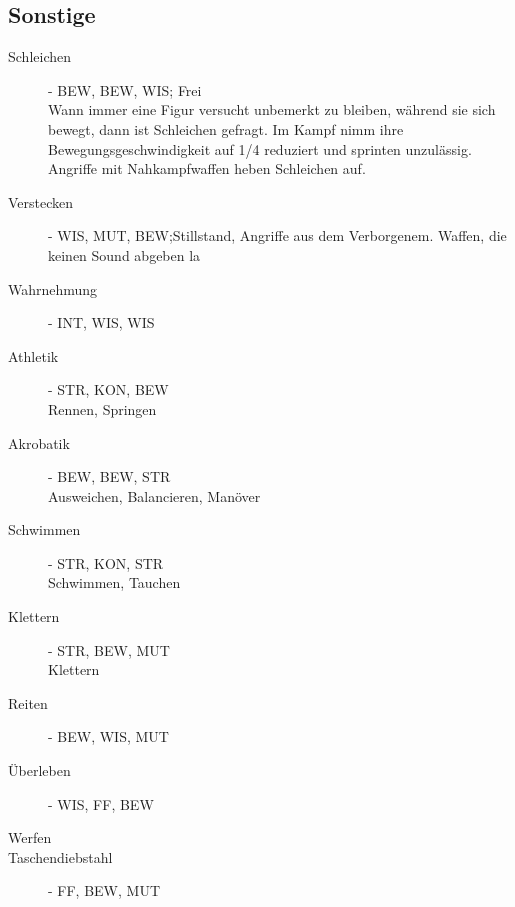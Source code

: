 \documentclass[a4paper,12pt,oneside]{book}
\begin{document}
\subsection{Sonstige}
\begin{description}
\item[Schleichen]- BEW, BEW, WIS; Frei
\\Wann immer eine Figur versucht unbemerkt zu bleiben, während sie sich bewegt, dann ist Schleichen gefragt. Im Kampf nimm ihre Bewegungsgeschwindigkeit auf 1/4 reduziert und sprinten unzulässig. Angriffe mit Nahkampfwaffen heben Schleichen auf.
\item[Verstecken]- WIS, MUT, BEW;Stillstand, Angriffe aus dem Verborgenem. Waffen, die keinen Sound abgeben la
\item[Wahrnehmung]- INT, WIS, WIS
\item[Athletik]- STR, KON, BEW
\\Rennen, Springen 
\item[Akrobatik]- BEW, BEW, STR
\\Ausweichen, Balancieren, Manöver
\item[Schwimmen]- STR, KON, STR
\\Schwimmen, Tauchen
\item[Klettern]- STR, BEW, MUT
\\Klettern
\item[Reiten]- BEW, WIS, MUT
\item[Überleben]- WIS, FF, BEW
\item[Werfen]
\item[Taschendiebstahl]- FF, BEW, MUT


\end{description}
\end{document}
